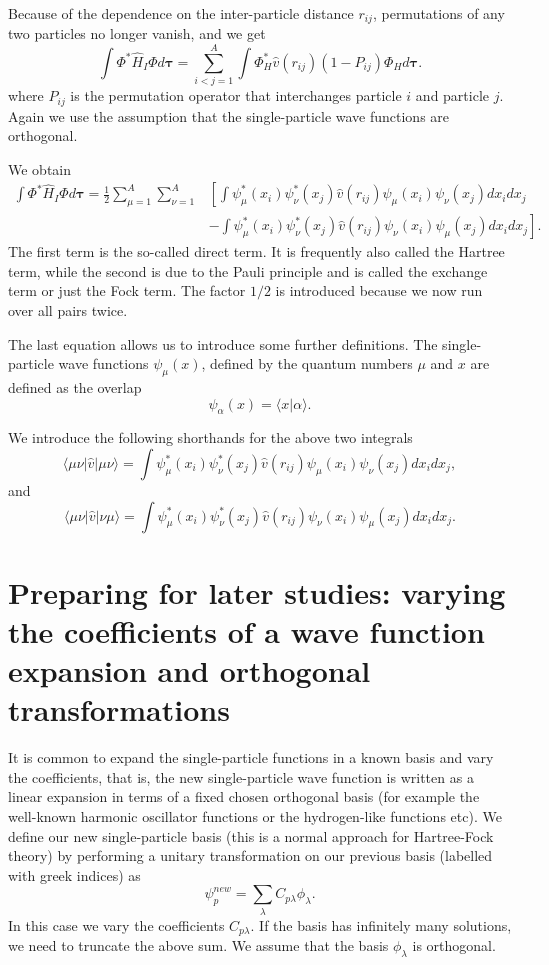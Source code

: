 Because of the dependence on the inter-particle distance $r_{ij}$,  permutations of
any two particles no longer vanish, and we get
\[
  \int \Phi^*\hat{H}_I\Phi d\mathbf{\tau} 
  = \sum_{i < j=1}^A \int  
  \Phi_H^*\hat{v}(r_{ij})(1-P_{ij})\Phi_H d\mathbf{\tau}.
\]
where $P_{ij}$ is the permutation operator that interchanges
particle $i$ and particle $j$. Again we use the assumption that the single-particle wave functions
are orthogonal. 

We obtain
\begin{align}
  \int \Phi^*\hat{H}_I\Phi d\mathbf{\tau} 
  = \frac{1}{2}\sum_{\mu=1}^A\sum_{\nu=1}^A
    &\left[ \int \psi_{\mu}^*(x_i)\psi_{\nu}^*(x_j)\hat{v}(r_{ij})\psi_{\mu}(x_i)\psi_{\nu}(x_j)
    dx_idx_j \right.\\
  &\left.
  - \int \psi_{\mu}^*(x_i)\psi_{\nu}^*(x_j)
  \hat{v}(r_{ij})\psi_{\nu}(x_i)\psi_{\mu}(x_j)
  dx_idx_j
  \right]. \label{H2Expectation}
\end{align}
The first term is the so-called direct term. It is frequently also called the  Hartree term, 
while the second is due to the Pauli principle and is called
the exchange term or just the Fock term.
The factor  $1/2$ is introduced because we now run over
all pairs twice. 

The last equation allows us to  introduce some further definitions.  
The single-particle wave functions $\psi_{\mu}(x)$, defined by the quantum numbers $\mu$ and $x$
are defined as the overlap 
\[
   \psi_{\alpha}(x)  = \langle x | \alpha \rangle .
\]

We introduce the following shorthands for the above two integrals
\[
\langle \mu\nu|\hat{v}|\mu\nu\rangle =  \int \psi_{\mu}^*(x_i)\psi_{\nu}^*(x_j)\hat{v}(r_{ij})\psi_{\mu}(x_i)\psi_{\nu}(x_j)
    dx_idx_j,
\]
and
\[
\langle \mu\nu|\hat{v}|\nu\mu\rangle = \int \psi_{\mu}^*(x_i)\psi_{\nu}^*(x_j)
  \hat{v}(r_{ij})\psi_{\nu}(x_i)\psi_{\mu}(x_j)
  dx_idx_j.  
\]

\section{Preparing for later studies: varying the coefficients of a wave function expansion and orthogonal transformations}

It is common to  expand the single-particle functions in a known basis  and vary the coefficients, 
that is, the new single-particle wave function is written as a linear expansion
in terms of a fixed chosen orthogonal basis (for example the well-known harmonic oscillator functions or the hydrogen-like functions etc).
We define our new single-particle basis (this is a normal approach for Hartree-Fock theory) by performing a unitary transformation 
on our previous basis (labelled with greek indices) as
\begin{equation}
\psi_p^{new}  = \sum_{\lambda} C_{p\lambda}\phi_{\lambda}. \label{eq:newbasis}
\end{equation}
In this case we vary the coefficients $C_{p\lambda}$. If the basis has infinitely many solutions, we need
to truncate the above sum.  We assume that the basis $\phi_{\lambda}$ is orthogonal.

